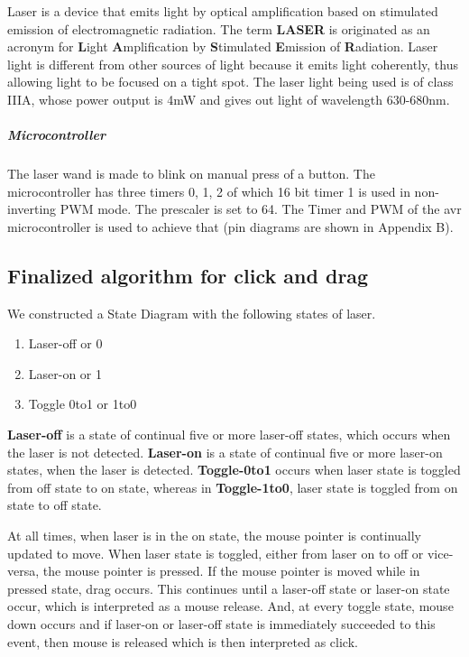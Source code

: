 \documentclass[12pt, a4paper]{article}
\begin{document}
Laser is a device that emits light by optical amplification based on stimulated emission of electromagnetic radiation. The term \textbf{LASER} is originated as an acronym for \textbf{L}ight \textbf{A}mplification by \textbf{S}timulated \textbf{E}mission of \textbf{R}adiation. Laser light is different from other sources of light because it emits light coherently, thus allowing light to be focused on a tight spot. The laser light being used is of class IIIA, whose power output is 4mW and gives out light of wavelength 630-680nm. 

\subparagraph{Microcontroller}

The laser wand is made to blink on manual press of a button. The microcontroller has three timers 0, 1, 2 of which 16 bit timer 1 is used in non-inverting PWM mode. The prescaler is set to 64. The Timer and PWM of the avr microcontroller is used to achieve that (pin diagrams are shown in Appendix B).

\subsection{Finalized algorithm for click and drag}
	We constructed a State Diagram with the following states of laser.
\begin{enumerate}
\item Laser-off or 0
\item Laser-on or 1
\item Toggle 0to1 or 1to0 
\end{enumerate}

	\textbf {Laser-off} is a state of continual five or more laser-off  states, which occurs when the laser is not detected. \textbf{Laser-on} is a state of continual five or more laser-on states, when the laser is detected. \textbf{Toggle-0to1} occurs when laser state is toggled from off state to on state, whereas in \textbf{Toggle-1to0}, laser state is toggled from on state to off state. 
	
	At all times, when laser is in the on state, the mouse pointer is continually updated to move. When laser state is toggled, either from laser on to off or vice-versa, the mouse pointer is pressed. If the mouse pointer is moved while in pressed state, drag occurs. This continues until a laser-off state or laser-on state occur, which is interpreted as a mouse release. And, at every toggle state, mouse down occurs and if laser-on or laser-off state is immediately succeeded to this event, then mouse is released which is then interpreted as click.
	
\end{document}
